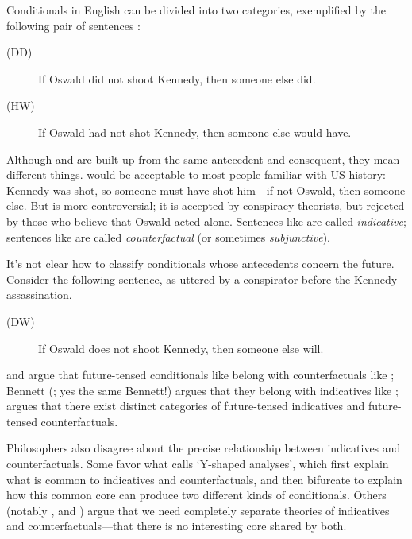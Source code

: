 Conditionals in English can be divided into two categories, exemplified by the following pair of sentences \citep{adams:subjunctive}:
\begin{description}
\item[(DD)] If Oswald did not shoot Kennedy, then someone else did.
\item[(HW)] If Oswald had not shot Kennedy, then someone else would have.
\end{description}
Although  and  are built up from the same antecedent and consequent, they mean different things.  would be acceptable to most people familiar with US history: Kennedy was shot, so someone must have shot him---if not Oswald, then someone else.  But  is more controversial; it is accepted by conspiracy theorists, but rejected by those who believe that Oswald acted alone.  Sentences like  are called \emph{indicative}; sentences like  are called \emph{counterfactual} (or sometimes \emph{subjunctive}).

It's not clear how to classify conditionals whose antecedents concern the future.  Consider the following sentence, as uttered by a conspirator before the Kennedy assassination.
\begin{description}
\item[(DW)] If Oswald does not shoot Kennedy, then someone else will.
\end{description}
\citet{dudman-tense-article, dudman-parsing} and \citet{bennett-phlogiston} argue that future-tensed conditionals like  belong with counterfactuals like ; Bennett (\citeyear{Bennett2003-BENAPG, bennett-explanations}; yes the same Bennett!) argues that they belong with indicatives like ; \citet{edgington-conditionals} argues that there exist distinct categories of future-tensed indicatives and future-tensed counterfactuals.

Philosophers also disagree about the precise relationship between indicatives and counterfactuals.  Some favor what \citet{Bennett2003-BENAPG} calls `Y-shaped analyses', which first explain what is common to indicatives and counterfactuals, and then bifurcate to explain how this common core can produce two different kinds of conditionals.  Others (notably \citealp{Gibbard1981-GIBTRT}, and \citealp{Bennett2003-BENAPG}) argue that we need completely separate theories of indicatives and counterfactuals---that there is no interesting core shared by both.

